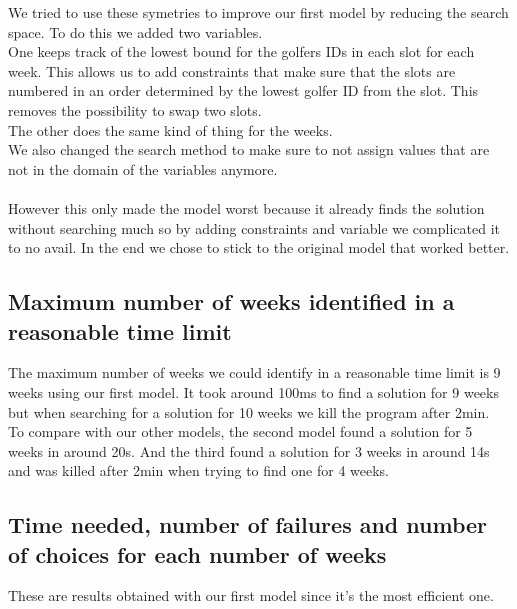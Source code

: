 \documentclass{eplDoc}
\begin{document}
We tried to use these symetries to improve our first model by reducing the search space. To do this we added two variables. \\ 
One keeps track of the lowest bound for the golfers IDs in each slot for each week. This allows us to add constraints that make sure that the slots are numbered in an order determined by the lowest golfer ID from the slot. This removes the possibility to swap two slots. \\ 
The other does the same kind of thing for the weeks. \\ 
We also changed the search method to make sure to not assign values that are not in the domain of the variables anymore. \\ \\ 

However this only made the model worst because it already finds the solution without searching much so by adding constraints and variable we complicated it to no avail. In the end we chose to stick to the original model that worked better. \\ 





\subsection{Maximum number of weeks identified in a reasonable time limit}
The maximum number of weeks we could identify in a reasonable time limit is 9 weeks using our first model. It took around 100ms to find a solution for 9 weeks but when searching for a solution for 10 weeks we kill the program after 2min. \\ 
To compare with our other models, the second model found a solution for 5 weeks in around 20s. And the third found a solution for 3 weeks in around 14s and was killed after 2min when trying to find one for 4 weeks. \\ 

\subsection{Time needed, number of failures and number of choices for each number of weeks}
These are results obtained with our first model since it's the most efficient one. 
\end{document}
